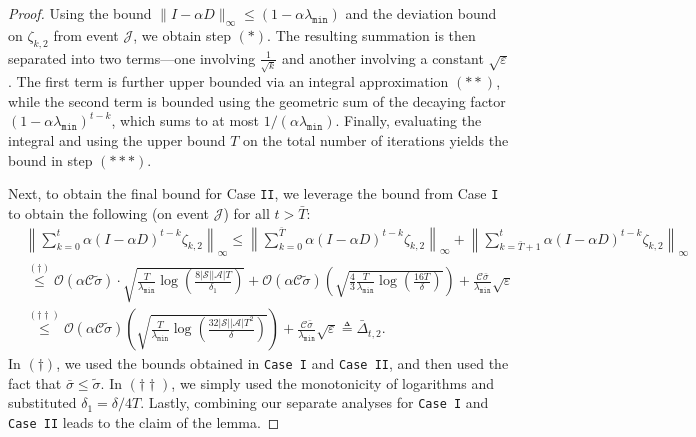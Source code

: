 \documentclass{article}
\newcommand{\mc}{\mathcal}
\begin{document}
\begin{proof}
Using the bound \(\|I - \alpha D\|_\infty \leq (1 - \alpha \lambda_{\texttt{min}})\) and the deviation bound on \(\zeta_{k,2}\) from event \(\mc{J}\), we obtain step \((*)\). The resulting summation is then separated into two terms—one involving \(\frac{1}{\sqrt{k}}\) and another involving a constant \(\sqrt{\varepsilon}\). The first term is further upper bounded via an integral approximation \((**)\), while the second term is bounded using the geometric sum of the decaying factor \((1 - \alpha \lambda_{\texttt{min}})^{t-k}\), which sums to at most \(1/(\alpha \lambda_{\texttt{min}})\). Finally, evaluating the integral and using the upper bound $T$ on the total number of iterations yields the bound in step \((***)\). 

Next, to obtain the final bound for Case \texttt{II}, we leverage the bound from Case \texttt{I} to obtain the following (on event $\mc{J}$) for all \(t > \bar{T}\):
\begin{equation}\label{eqn:delta_2}
\begin{aligned}
    &\left\lVert \sum_{k=0}^{t} \alpha (I-\alpha D)^{t-k} \mathcal{\zeta}_{k,2}\right\rVert_\infty \le \left\lVert \sum_{k=0}^{\bar{T}} \alpha (I-\alpha D)^{t-k} \mathcal{\zeta}_{k,2}\right\rVert_\infty + \left\lVert \sum_{k=\bar{T}+1}^{t} \alpha (I-\alpha D)^{t-k} \mathcal{\zeta}_{k,2}\right\rVert_\infty\\
    &\overset{(\dagger)}{\le}   \mc{O}(\alpha \mc{C}\tilde{\sigma}) \cdot\sqrt{\frac{T}{\lambda_{\texttt{min}}}\log\left(\frac{8|\mathcal{S}||\mathcal{A}|T}{\delta_1}\right)} + \mc{O}({\alpha \mc{C}\tilde{\sigma}})\left(\sqrt{\frac{4}{3}\frac{T}{\lambda_{\texttt{min}}}\log\left(\frac{16T}{\delta}\right)}\right) + \frac{\mc{C}\bar{\sigma}}{\lambda_{\texttt{min}}}\sqrt{\varepsilon}\\
    & \overset{(\dagger \dagger)}{\le}  \mc{O}(\alpha \mc{C} \tilde{\sigma})\left(\sqrt{\frac{T}{\lambda_{\texttt{min}}}\log\left(\frac{32\lvert\mc{S}\rvert\lvert\mc{A}\rvert T^2}{\delta}\right)}\right) + \frac{\mc{C}\bar{\sigma}}{\lambda_{\texttt{min}}}\sqrt{\varepsilon} \triangleq \bar{\Delta}_{t,2}.
    \end{aligned}
\end{equation}
In \((\dagger)\), we used the bounds obtained in \texttt{Case I} and \texttt{Case II}, and then used the fact that \(\bar{\sigma} \le \tilde{\sigma}\). In \((\dagger \dagger)\), we simply used the monotonicity of logarithms and substituted \(\delta_1 = \delta/4T\). Lastly, combining our separate analyses for \texttt{Case I} and \texttt{Case II} leads to the claim of the lemma. 
\end{proof}
\end{document}
